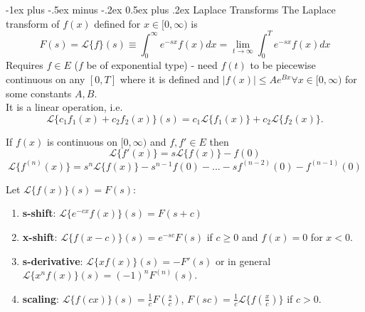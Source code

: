 \documentclass[10pt,landscape]{article}
\makeatletter
\renewcommand{\section}{\@startsection{section}{1}{0mm}%
                                {-1ex plus -.5ex minus -.2ex}%
                                {0.5ex plus .2ex}%
                                {\normalfont\large\bfseries}}
\makeatother
\begin{document}
\begin{multicols}{3}
\section{Laplace Transforms}
The Laplace transform of $f(x)$ defined for $x\in [0, \infty)$ is $$ F(s) = \mathcal{L}\{f\}(s) \equiv \int_0^\infty e^{-sx} f(x) dx = \lim_{t \rightarrow \infty} \int_0^T e^{-sx}f(x)dx$$ Requires $f \in E$ ($f$ be of exponential type) - need $f(t)$ to be piecewise continuous on any $[0,T]$ where it is defined and $|f(x)| \leq Ae^{Bx} \forall x \in [0,\infty)$ for some constants $A,B$. \\
It is a linear operation, i.e. $$\mathcal{L} \{c_1f_1(x) + c_2f_2(x)\}(s) = c_1 \mathcal{L} \{f_1(x)\} + c_2 \mathcal{L} \{f_2(x)\} .$$

If $f(x)$ is continuous on $[0,\infty)$ and $f,f' \in  E$ then $$ \mathcal{L} \{f'(x)\} = s\mathcal{L}\{f(x)\} - f(0)$$
$$ \mathcal{L} \{f^{(n)}(x)\} = s^n\mathcal{L}\{f(x)\} - s^{n-1}f(0)-...-sf^{(n-2)}(0) - f^{(n-1)}(0)$$

Let $\mathcal{L}\{f(x)\}(s) = F(s)$:
\begin{enumerate}
 	\item \textbf{s-shift}:  $\mathcal{L}\{e^{-cx}f(x)\}(s) = F(s+c)$
	\item \textbf{x-shift}:  $\mathcal{L}\{f(x-c)\}(s) = e^{-sc} F(s)$ if $c\geq 0$ and $f(x)=0$ for $x<0$.
	\item \textbf{s-derivative}:  $\mathcal{L}\{xf(x)\}(s) = -F'(s)$ or in general $\mathcal{L}\{x^nf(x)\}(s) = (-1)^nF^{(n)}(s)$.
	\item \textbf{scaling}:  $\mathcal{L}\{f(cx)\}(s) = \frac{1}{c}F(\frac{s}{c})$,  $F(sc) = \frac{1}{c} \mathcal{L}\{f\left(\frac{x}{c}\right)\}$ if $c > 0$.
\end{enumerate}


\end{multicols}
\end{document}
